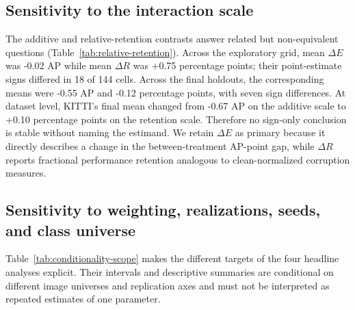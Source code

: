 \documentclass[a4paper,fleqn]{cas-dc}
\begin{document}
\subsection{Sensitivity to the interaction scale}
\label{sec:scale-results}

The additive and relative-retention contrasts answer related but non-equivalent questions (Table~\ref{tab:relative-retention}). Across the exploratory grid, mean $\Delta E$ was -0.02 AP while mean $\Delta R$ was +0.75 percentage points; their point-estimate signs differed in 18 of 144 cells. Across the final holdouts, the corresponding means were -0.55 AP and -0.12 percentage points, with seven sign differences. At dataset level, KITTI's final mean changed from -0.67 AP on the additive scale to +0.10 percentage points on the retention scale. Therefore no sign-only conclusion is stable without naming the estimand. We retain $\Delta E$ as primary because it directly describes a change in the between-treatment AP-point gap, while $\Delta R$ reports fractional performance retention analogous to clean-normalized corruption measures.

\begin{table}[t]
\centering
\caption{Metric-scale sensitivity. $\Delta R$ is the FP8-minus-INT8 difference in the percentage of matched-clean AP retained. ``Sign differences'' counts cell-level disagreement between $\Delta E$ and $\Delta R$.}
\label{tab:relative-retention}
\scriptsize
\resizebox{\columnwidth}{!}{}
\end{table}

\subsection{Sensitivity to weighting, realizations, seeds, and class universe}
\label{sec:sensitivity-results}

Table~\ref{tab:conditionality-scope} makes the different targets of the four headline analyses explicit. Their intervals and descriptive summaries are conditional on different image universes and replication axes and must not be interpreted as repeated estimates of one parameter.

\begin{table}[t]
\centering
\caption{Scope of the principal conditionality analyses. ``Cells'' counts direct conditions; the realization row also states its 36 base conditions. S1/3/5 denote severity labels.}
\label{tab:conditionality-scope}
\scriptsize
\resizebox{\textwidth}{!}{}
\end{table}
\FloatBarrier
\end{document}
